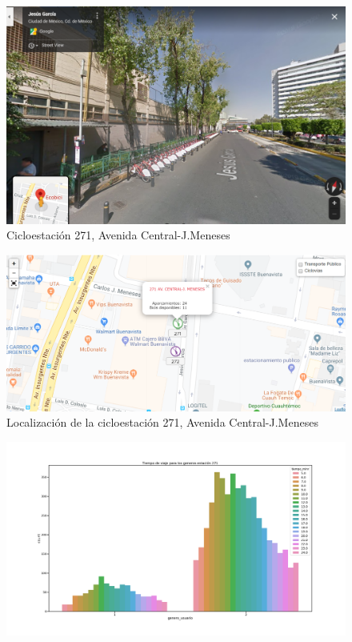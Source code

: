 \documentclass[9pt,twocolumn,twoside]{ilcss}
\begin{document}
\begin{appendices}
\begin{figure}[tbhp]
	\centering
	\includegraphics[width=0.9\linewidth]{Paper/images/estacion271.png}
	\caption{Cicloestación 271, Avenida Central-J.Meneses}
	\label{fig:pen_habs_penbc271}
\end{figure}
\begin{figure}[tbhp]
	\centering
	\includegraphics[width=0.9\linewidth]{Paper/images/estacion271_mapa.png}
	\caption{ Localización de la cicloestación 271, Avenida Central-J.Meneses}
	\label{fig:pen_habs_penbc271loc}
\end{figure}
\begin{figure}[tbhp]
	\centering
	\includegraphics[width=0.9\linewidth]{Paper/images/tiempo_genero271.png}

\end{figure}
\end{appendices}
\end{document}
